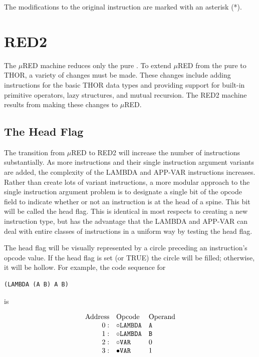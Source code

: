 The modifications to the original  instruction are marked with an
asterisk (*).

\section{RED2}

The \(\mu\)RED machine reduces only the pure \lambdacalculus{}. To extend \(\mu\)RED from the pure \lambdacalculus{} to THOR, a variety of changes must be made. These changes include adding instructions for the basic THOR data types and providing support for built-in primitive operators, lazy structures, and mutual recursion. The RED2 machine results from making these changes to \(\mu\)RED.

\subsection{The Head Flag}

The transition from \(\mu\)RED to RED2 will increase the number of instructions substantially. As more instructions and their single instruction argument variants are added, the complexity of the LAMBDA and APP-VAR instructions increases. Rather than create lots of variant instructions, a more modular approach to the single instruction argument problem is to designate a single bit of the opcode field to indicate whether or not an instruction is at the head of a spine. This bit will be called the head flag. This is identical in most respects to creating a new instruction type, but has the advantage that the LAMBDA and APP-VAR can deal with entire classes of instructions in a uniform way by testing the head flag.

The head flag will be visually represented by a circle preceding an instruction's opcode
value. If the head flag is set (or TRUE) the circle will be filled; otherwise, it will be
hollow. For example, the code sequence for

\begin{verbatim}
(LAMBDA (A B) A B)
\end{verbatim}

is


\[
\begin{array}{rll}
\text{Address} & \text{Opcode} & \text{Operand}\\
0: & \circ\texttt{LAMBDA} & \texttt{A}\\
1: & \circ\texttt{LAMBDA} & \texttt{B}\\
2: & \circ\texttt{VAR} & 0\\
3: & \bullet\texttt{VAR} & 1
\end{array}
\]

